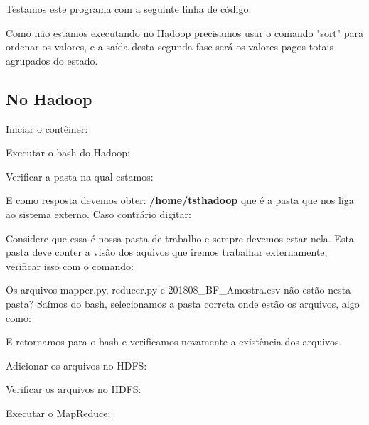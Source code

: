 \documentclass[a4paper,11pt]{article}
\begin{document}
Testamos este programa com a seguinte linha de código: \\

Como não estamos executando no Hadoop precisamos usar o comando "sort" para ordenar os valores, e a saída desta segunda fase será os valores pagos totais agrupados do estado.

\subsection{No Hadoop}
Iniciar o contêiner: \\

Executar o bash do Hadoop: \\

Verificar a pasta na qual estamos: \\

E como resposta devemos obter: \textbf{/home/tsthadoop} que é a pasta que nos liga ao sistema externo. Caso contrário digitar: \\

Considere que essa é nossa pasta de trabalho e sempre devemos estar nela. Esta pasta deve conter a visão dos aquivos que iremos trabalhar externamente, verificar isso com o comando: \\

Os arquivos mapper.py, reducer.py e 201808\_BF\_Amostra.csv não estão nesta pasta? Saímos do bash, selecionamos a pasta correta onde estão os arquivos, algo como: \\

E retornamos para o bash e verificamos novamente a existência dos arquivos.

Adicionar os arquivos no HDFS: \\

Verificar os arquivos no HDFS: \\

Executar o MapReduce: \\
\end{document}
